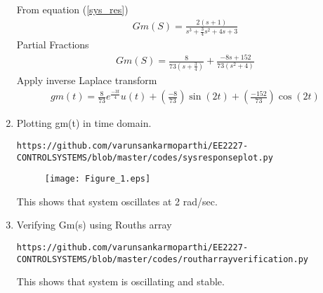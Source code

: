 \begin{enumerate}[label=\thesection.\arabic*.,ref=\thesection.\theenumi]
\solution
From equation (\ref{sys_res})
\begin{align}
 Gm(S) = \frac{2(s+1)}{s^3+\frac{3}{4}s^2+4s+3} 
\end{align}
Partial Fractions
\begin{align}
 Gm(S) = \frac{8}{73(s+\frac{3}{4})}+ \frac{-8s+152}{73(s^2+4)}
\end{align}
Apply inverse Laplace transform
\begin{align}
 gm(t) = \frac{8}{73}e^{\frac{-3t}{4}}u(t)+ (\frac{-8}{73})\sin(2t) +(\frac{-152}{73})\cos(2t)
\end{align}



\item Plotting gm(t) in time domain.
\begin{lstlisting}
https://github.com/varunsankarmoparthi/EE2227-CONTROLSYSTEMS/blob/master/codes/sysresponseplot.py
\end{lstlisting}
\begin{figure}[!h]
  \texttt{[image: Figure\_1.eps]}
 
\end{figure}

This shows that system oscillates at 2 rad/sec.
\item Verifying Gm(s) using Rouths array
\begin{lstlisting}
https://github.com/varunsankarmoparthi/EE2227-CONTROLSYSTEMS/blob/master/codes/routharrayverification.py
\end{lstlisting}
This shows that system is oscillating and stable.
\end{enumerate}
